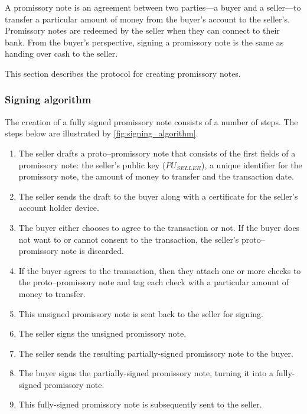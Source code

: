 \documentclass[12pt,a4paper]{article}
\begin{document}
\begin{multicols}{2}
	A promissory note is an agreement between two parties---a buyer and a seller---to transfer a particular amount of money from the buyer's account to the seller's. Promissory notes are redeemed by the seller when they can connect to their bank. From the buyer's perspective, signing a promissory note is the same as handing over cash to the seller. 
	
	This section describes the protocol for creating promissory notes.

	\subsubsection{Signing algorithm}
	
	The creation of a fully signed promissory note consists of a number of steps. The steps below are illustrated by \autoref{fig:signing_algorithm}.
	
	\begin{enumerate}
		\item The seller drafts a proto--promissory note that consists of the first fields of a promissory note: the seller's public key ($PU_{SELLER}$), a unique identifier for the promissory note, the amount of money to transfer and the transaction date.
		
		\item The seller sends the draft to the buyer along with a certificate for the seller's account holder device.
		
		\item The buyer either chooses to agree to the transaction or not. If the buyer does not want to or cannot consent to the transaction, the seller's proto--promissory note is discarded.
		
		\item If the buyer agrees to the transaction, then they attach one or more checks to the proto--promissory note and tag each check with a particular amount of money to transfer. 
		
		\item This unsigned promissory note is sent back to the seller for signing.
		
		\item The seller signs the unsigned promissory note.
		
		\item The seller sends the resulting partially-signed promissory note to the buyer.
		
		\item The buyer signs the partially-signed promissory note, turning it into a fully-signed promissory note.
		
		\item This fully-signed promissory note is subsequently sent to the seller.
	\end{enumerate}

	\end{multicols}
	\newpage
	
\end{document}
